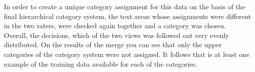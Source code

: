 
In order to create a unique category assignment for this data on the basis of the final hierarchical category system, the text areas whose assignments were different in the two raters, were checked again together and a category was chosen. Overall, the decisions, which of the two views was followed out very evenly distributed. On the results of the merge you can see that only the upper categories of the category system were not assigned. It follows that is at least one example of the training data available for each of the categories.


